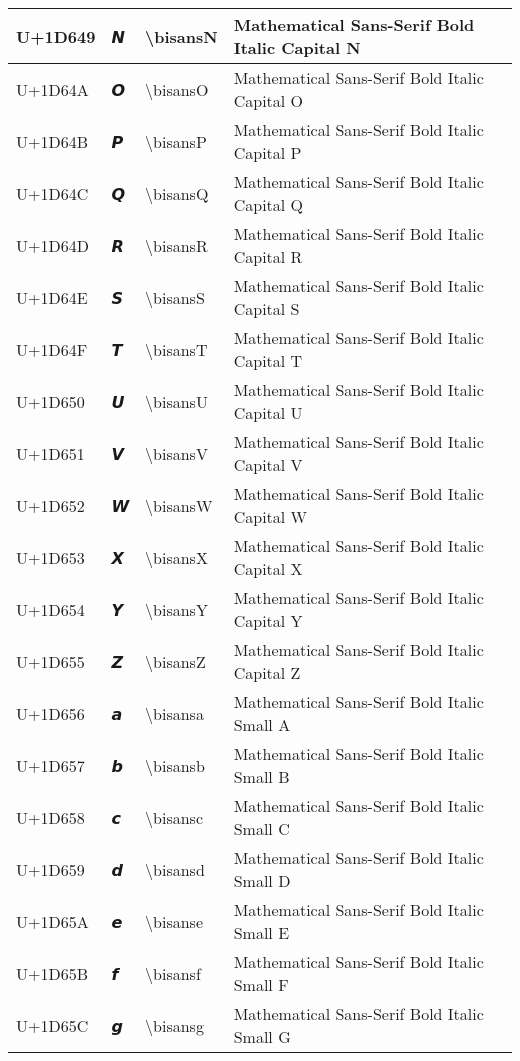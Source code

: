 \begin{table}[h]
\begin{tabulary}{\linewidth}{|L|L|L|L|}
\hline
U+1D649 & 𝙉 & {\textbackslash}bisansN & Mathematical Sans-Serif Bold Italic Capital N \\
\hline
U+1D64A & 𝙊 & {\textbackslash}bisansO & Mathematical Sans-Serif Bold Italic Capital O \\
\hline
U+1D64B & 𝙋 & {\textbackslash}bisansP & Mathematical Sans-Serif Bold Italic Capital P \\
\hline
U+1D64C & 𝙌 & {\textbackslash}bisansQ & Mathematical Sans-Serif Bold Italic Capital Q \\
\hline
U+1D64D & 𝙍 & {\textbackslash}bisansR & Mathematical Sans-Serif Bold Italic Capital R \\
\hline
U+1D64E & 𝙎 & {\textbackslash}bisansS & Mathematical Sans-Serif Bold Italic Capital S \\
\hline
U+1D64F & 𝙏 & {\textbackslash}bisansT & Mathematical Sans-Serif Bold Italic Capital T \\
\hline
U+1D650 & 𝙐 & {\textbackslash}bisansU & Mathematical Sans-Serif Bold Italic Capital U \\
\hline
U+1D651 & 𝙑 & {\textbackslash}bisansV & Mathematical Sans-Serif Bold Italic Capital V \\
\hline
U+1D652 & 𝙒 & {\textbackslash}bisansW & Mathematical Sans-Serif Bold Italic Capital W \\
\hline
U+1D653 & 𝙓 & {\textbackslash}bisansX & Mathematical Sans-Serif Bold Italic Capital X \\
\hline
U+1D654 & 𝙔 & {\textbackslash}bisansY & Mathematical Sans-Serif Bold Italic Capital Y \\
\hline
U+1D655 & 𝙕 & {\textbackslash}bisansZ & Mathematical Sans-Serif Bold Italic Capital Z \\
\hline
U+1D656 & 𝙖 & {\textbackslash}bisansa & Mathematical Sans-Serif Bold Italic Small A \\
\hline
U+1D657 & 𝙗 & {\textbackslash}bisansb & Mathematical Sans-Serif Bold Italic Small B \\
\hline
U+1D658 & 𝙘 & {\textbackslash}bisansc & Mathematical Sans-Serif Bold Italic Small C \\
\hline
U+1D659 & 𝙙 & {\textbackslash}bisansd & Mathematical Sans-Serif Bold Italic Small D \\
\hline
U+1D65A & 𝙚 & {\textbackslash}bisanse & Mathematical Sans-Serif Bold Italic Small E \\
\hline
U+1D65B & 𝙛 & {\textbackslash}bisansf & Mathematical Sans-Serif Bold Italic Small F \\
\hline
U+1D65C & 𝙜 & {\textbackslash}bisansg & Mathematical Sans-Serif Bold Italic Small G \\

\end{tabulary}
\end{table}
